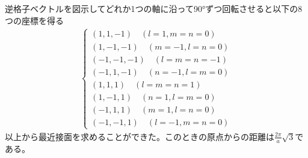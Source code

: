 \documentclass[a4paper,11pt,dvipdfmx]{jsarticle}
\begin{document}
\begin{enumerate}
      逆格子ベクトルを図示してどれか1つの軸に沿って90°ずつ回転させると以下の8つの座標を得る
      \begin{align*}
        \begin{cases}
          (1, 1, -1) \quad (l = 1, m = n = 0) \\
          (1, -1, -1) \quad (m = -1, l = n = 0) \\
          (-1, -1, -1) \quad (l = m = n = -1) \\
          (-1, 1, -1) \quad (n = -1, l = m = 0) \\
          (1, 1, 1) \quad (l = m = n = 1) \\
          (1, -1, 1) \quad (n = 1, l = m = 0) \\
          (-1, 1, 1) \quad (m = 1, l = n = 0) \\
          (-1, -1, 1) \quad (l = -1, m = n = 0) 
        \end{cases}
      \end{align*}
      以上から最近接面を求めることができた。このときの原点からの距離は$\displaystyle \frac{2\pi}{a} \sqrt{3}$である。
      

\end{enumerate}
\end{document}
